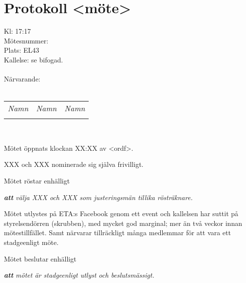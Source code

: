 




\section*{\center Protokoll <möte> \datummote}
Kl: 17:17\\
Mötesnummer: \nr \ \verksamhetsar\\
Plats: EL43\\
Kallelse: se bifogad.\\ \\
Närvarande:\\ \\

\begin{tabular}{l l l}
\itshape Namn & \itshape Namn & \itshape Namn\\
  & & \\

\end{tabular}\\


Mötet öppnats klockan XX:XX av <ordf>.



XXX och XXX nominerade sig själva frivilligt.

Mötet röstar enhälligt

\emph{\textbf{att} välja XXX och XXX som justeringsmän tillika rösträknare.}





Mötet utlystes på ETA:s Facebook genom ett event och kallelsen har suttit på styrelsendörren (skrubben), med mycket god marginal; mer än två veckor innan mötestillfället. Samt närvarar tillräckligt många medlemmar för att vara ett stadgeenligt möte.

Mötet beslutar enhälligt

\emph{\textbf{att} mötet är stadgeenligt utlyst och beslutsmässigt.}





